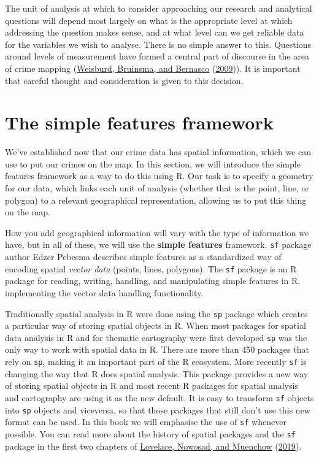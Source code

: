 \documentclass[
]{book}
\begin{document}
The unit of analysis at which to consider approaching our research and analytical questions will depend most largely on what is the appropriate level at which addressing the question makes sense, and at what level can we get reliable data for the variables we wish to analyse. There is no simple answer to this. Questions around levels of measurement have formed a central part of discourse in the area of crime mapping (\protect\hyperlink{ref-Weisburd_2009}{Weisburd, Bruinsma, and Bernasco} (\protect\hyperlink{ref-Weisburd_2009}{2009})). It is important that careful thought and consideration is given to this decision.

\hypertarget{the-simple-features-framework}{%
\section{The simple features framework}\label{the-simple-features-framework}}

We've established now that our crime data has spatial information, which we can use to put our crimes on the map. In this section, we will introduce the simple features framework as a way to do this using R. Our task is to specify a geometry for our data, which links each unit of analysis (whether that is the point, line, or polygon) to a relevant geographical representation, allowing us to put this thing on the map.

How you add geographical information will vary with the type of information we have, but in all of these, we will use the \textbf{simple features} framework. \texttt{sf} package author Edzer Pebesma describes simple features as a standardized way of encoding spatial \emph{vector data} (points, lines, polygons). The \texttt{sf} package is an R package for reading, writing, handling, and manipulating simple features in R, implementing the vector data handling functionality.

Traditionally spatial analysis in R were done using the \texttt{sp} package which creates a particular way of storing spatial objects in R. When most packages for spatial data analysis in R and for thematic cartography were first developed \texttt{sp} was the only way to work with spatial data in R. There are more than 450 packages that rely on \texttt{sp}, making it an important part of the R ecosystem. More recently \texttt{sf} is changing the way that R does spatial analysis. This package provides a new way of storing spatial objects in R and most recent R packages for spatial analysis and cartography are using it as the new default. It is easy to transform \texttt{sf} objects into \texttt{sp} objects and viceversa, so that those packages that still don't use this new format can be used. In this book we will emphasise the use of \texttt{sf} whenever possible. You can read more about the history of spatial packages and the \texttt{sf} package in the first two chapters of \protect\hyperlink{ref-Lovelace_2019}{Lovelace, Nowosad, and Muenchow} (\protect\hyperlink{ref-Lovelace_2019}{2019}).
\end{document}
